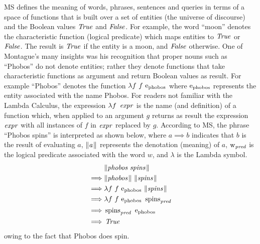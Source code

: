 \documentclass[../main.tex]{subfiles}
\begin{document}
\begin{refsection}
MS \cite{Dowty:wall} defines the meaning of words, phrases, sentences and queries in terms of a space of functions that is
built over a set of entities (the universe of discourse) and the Boolean values $\operatorname{\mathit{True}}$ and $\operatorname{\mathit{False}}$. For
example, the word ``moon'' denotes the characteristic function (logical predicate) which maps entities to
$\operatorname{\mathit{True}}$ or $\operatorname{\mathit{False}}$. The result is $\operatorname{\mathit{True}}$ if the entity is a moon, and $\operatorname{\mathit{False}}$ otherwise. One of Montague's many insights was his recognition that proper nouns such as ``Phobos'' do not denote entities; rather they
denote functions that take characteristic functions as argument and return Boolean values as result. For
example ``Phobos'' denotes the function $\lambda f \  f \  \mathrm{e}_{\operatorname{\operatorname{phobos}}}$ where $\mathrm{e}_{\operatorname{\operatorname{phobos}}}$ represents the entity associated with
the name Phobos. For readers not familiar with the Lambda Calculus, the expression $\lambda f \ \opit{expr}$ is the
name (and definition) of a function which, when applied to an argument $g$ returns as result the
expression $\operatorname{\mathit{expr}}$ with all instances of $f$ in $\operatorname{\mathit{expr}}$ replaced by $g$. According to MS, the phrase ``Phobos
spins'' is interpreted as shown below, where $a \implies b$ indicates that $b$ is the result of evaluating $a$, $\lVert\textit{a\hspace{0.1em}}\rVert$
represents the denotation (meaning) of $a$, $\operatorname{w}_{\operatorname{\mathit{pred}}}$ is the logical predicate associated with the word $w$,
and $\lambda$ is the Lambda symbol.
\begin{equation*}
	\begin{split}
		& \meaningof{phobos spins} \\
		\implies&  \meaningof{phobos}\ \meaningof{spins} \\
		\implies&  \lambda f\ f \ \entityassoc{phobos} \ \meaningof{spins} \\
		\implies&  \lambda f\ f \ \entityassoc{phobos} \ \wordpred{spins} \\
		\implies&  \wordpred{\spins} \ \entityassoc{phobos} \\
		\implies&  \True
	\end{split}
\end{equation*}
owing to the fact that Phobos does spin.


\end{refsection}
\end{document}
